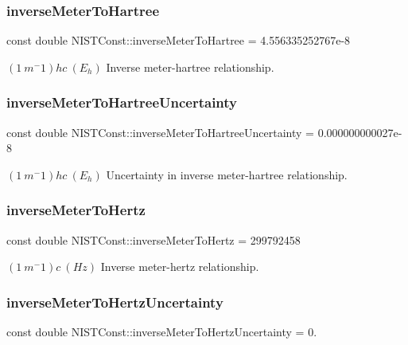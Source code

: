 \subsubsection{\texorpdfstring{inverse\+Meter\+To\+Hartree}{inverseMeterToHartree}}
{\footnotesize\ttfamily const double N\+I\+S\+T\+Const\+::inverse\+Meter\+To\+Hartree = 4.\+556335252767e-\/8}

$(1\ m^-1)hc \ (E_h)$ Inverse meter-\/hartree relationship. \mbox{\label{group___inverse_meter_gac31d4508dcf24c9b18d914aa6f8760a1}} 
\subsubsection{\texorpdfstring{inverse\+Meter\+To\+Hartree\+Uncertainty}{inverseMeterToHartreeUncertainty}}
{\footnotesize\ttfamily const double N\+I\+S\+T\+Const\+::inverse\+Meter\+To\+Hartree\+Uncertainty = 0.\+000000000027e-\/8}

$(1\ m^-1)hc \ (E_h)$ Uncertainty in inverse meter-\/hartree relationship. \mbox{\label{group___inverse_meter_ga5743c27316774c4f065336d0a016508e}} 
\subsubsection{\texorpdfstring{inverse\+Meter\+To\+Hertz}{inverseMeterToHertz}}
{\footnotesize\ttfamily const double N\+I\+S\+T\+Const\+::inverse\+Meter\+To\+Hertz = 299792458}

$(1\ m^-1)c \ (Hz)$ Inverse meter-\/hertz relationship. \mbox{\label{group___inverse_meter_ga96ba9736f99affda3bf53cb99bda10b0}} 
\subsubsection{\texorpdfstring{inverse\+Meter\+To\+Hertz\+Uncertainty}{inverseMeterToHertzUncertainty}}
{\footnotesize\ttfamily const double N\+I\+S\+T\+Const\+::inverse\+Meter\+To\+Hertz\+Uncertainty = 0.}

